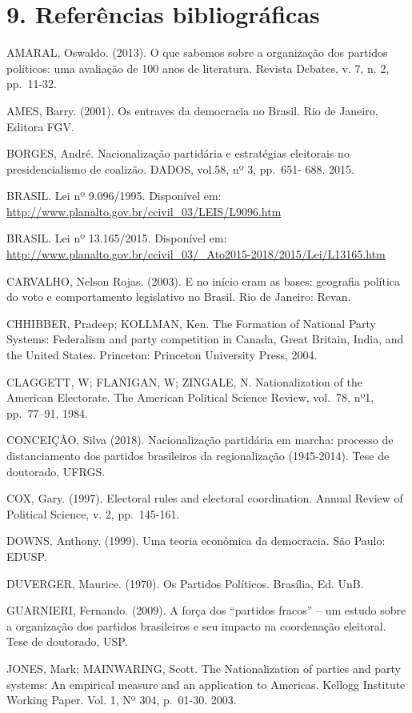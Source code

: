 \documentclass[]{article}
\begin{document}
\newpage

\section{9. Referências
bibliográficas}\label{referencias-bibliograficas}

AMARAL, Oswaldo. (2013). O que sabemos sobre a organização dos partidos
políticos: uma avaliação de 100 anos de literatura. Revista Debates, v.
7, n. 2, pp.~11-32.

AMES, Barry. (2001). Os entraves da democracia no Brasil. Rio de
Janeiro, Editora FGV.

BORGES, André. Nacionalização partidária e estratégias eleitorais no
presidencialismo de coalizão. DADOS, vol.58, nº 3, pp.~651- 688. 2015.

BRASIL. Lei nº 9.096/1995. Disponível em:
\url{http://www.planalto.gov.br/ccivil_03/LEIS/L9096.htm}

BRASIL. Lei nº 13.165/2015. Disponível em:
\url{http://www.planalto.gov.br/ccivil_03/_Ato2015-2018/2015/Lei/L13165.htm}

CARVALHO, Nelson Rojas. (2003). E no início eram as bases: geografia
política do voto e comportamento legislativo no Brasil. Rio de Janeiro:
Revan.

CHHIBBER, Pradeep; KOLLMAN, Ken. The Formation of National Party
Systems: Federalism and party competition in Canada, Great Britain,
India, and the United States. Princeton: Princeton University Press,
2004.

CLAGGETT, W; FLANIGAN, W; ZINGALE, N. Nationalization of the American
Electorate. The American Political Science Review, vol.~78, nº1,
pp.~77--91, 1984.

CONCEIÇÃO, Silva (2018). Nacionalização partidária em marcha: processo
de distanciamento dos partidos brasileiros da regionalização
(1945-2014). Tese de doutorado, UFRGS.

COX, Gary. (1997). Electoral rules and electoral coordination. Annual
Review of Political Science, v. 2, pp.~145-161.

DOWNS, Anthony. (1999). Uma teoria econômica da democracia. São Paulo:
EDUSP.

DUVERGER, Maurice. (1970). Os Partidos Políticos. Brasília, Ed. UnB.

GUARNIERI, Fernando. (2009). A força dos ``partidos fracos'' -- um
estudo sobre a organização dos partidos brasileiros e seu impacto na
coordenação eleitoral. Tese de doutorado, USP.

JONES, Mark; MAINWARING, Scott. The Nationalization of parties and party
systems: An empirical measure and an application to Americas. Kellogg
Institute Working Paper. Vol. 1, Nº 304, p.~01-30. 2003.
\end{document}
